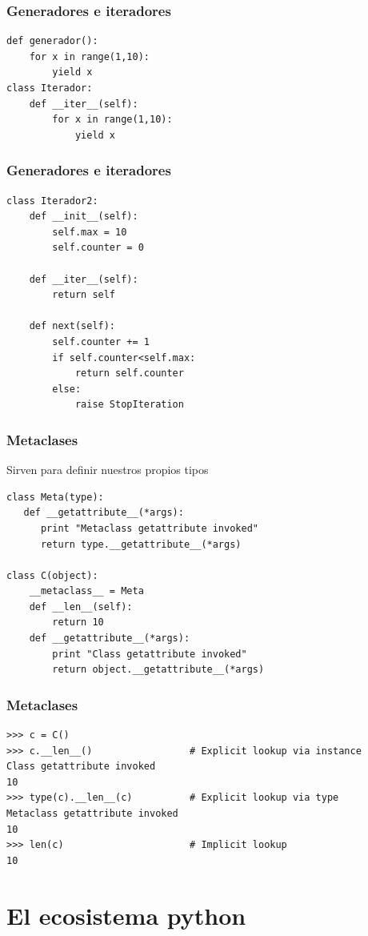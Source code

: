 \documentclass[10pt]{beamer}
\begin{document}
  \begin{frame}[containsverbatim]
    \frametitle{Generadores e iteradores}
    \begin{verbatim}
def generador():
    for x in range(1,10):
        yield x
class Iterador:
    def __iter__(self):
        for x in range(1,10):
            yield x
    \end{verbatim}
  \end{frame}

  \begin{frame}[containsverbatim]
    \frametitle{Generadores e iteradores}
    \begin{verbatim}
class Iterador2:
    def __init__(self):
        self.max = 10
        self.counter = 0

    def __iter__(self):
        return self

    def next(self):
        self.counter += 1
        if self.counter<self.max:
            return self.counter
        else:
            raise StopIteration
    \end{verbatim}
  \end{frame}

  \begin{frame}[containsverbatim]
    \frametitle{Metaclases}
    Sirven para definir nuestros propios tipos
    \begin{verbatim}
class Meta(type):
   def __getattribute__(*args):
      print "Metaclass getattribute invoked"
      return type.__getattribute__(*args)

class C(object):
    __metaclass__ = Meta
    def __len__(self):
        return 10
    def __getattribute__(*args):
        print "Class getattribute invoked"
        return object.__getattribute__(*args)
    \end{verbatim}
  \end{frame}

  \begin{frame}[containsverbatim]
    \frametitle{Metaclases}
    \begin{verbatim}
>>> c = C()
>>> c.__len__()                 # Explicit lookup via instance
Class getattribute invoked
10
>>> type(c).__len__(c)          # Explicit lookup via type
Metaclass getattribute invoked
10
>>> len(c)                      # Implicit lookup
10
    \end{verbatim}
  \end{frame}

  \section{El ecosistema python}
\end{document}
